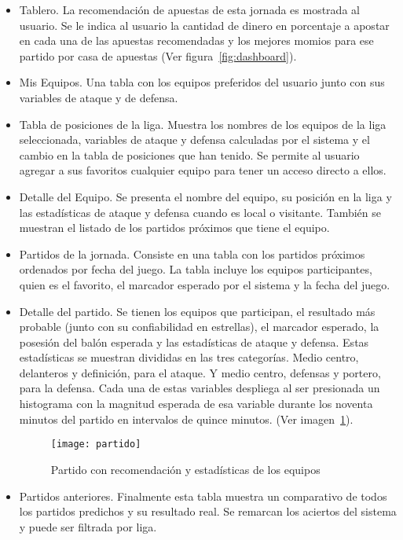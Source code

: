 \begin{itemize}
\begin{itemize}
				\item Tablero. La recomendación de apuestas de esta jornada es mostrada al usuario. Se le indica al usuario la cantidad de dinero en porcentaje a apostar en cada una de las apuestas recomendadas y los mejores momios para ese partido por casa de apuestas (Ver figura~\ref{fig:dashboard}).
				\item Mis Equipos. Una tabla con los equipos preferidos del usuario junto con sus variables de ataque y de defensa.
				\item Tabla de posiciones de la liga. Muestra los nombres de los equipos de la liga seleccionada, variables de ataque y defensa calculadas por el sistema  y el cambio en la tabla de posiciones que han tenido. Se permite al usuario agregar a sus favoritos cualquier equipo para tener un acceso directo a ellos.  
				\item Detalle del Equipo. Se presenta el nombre del equipo, su posición en la liga y las estadísticas de ataque y defensa cuando es local o visitante. También se muestran el listado de los partidos próximos que tiene el equipo.
				\item Partidos de la jornada. Consiste en una tabla con los partidos próximos ordenados por fecha del juego. La tabla incluye los equipos participantes, quien es el favorito, el marcador esperado por el sistema y la fecha del juego.
				\item Detalle del partido. Se tienen los equipos que participan, el resultado más probable (junto con su confiabilidad en estrellas), el marcador esperado, la posesión del balón esperada y las estadísticas de ataque y defensa. Estas estadísticas se muestran divididas en las tres categorías. Medio centro, delanteros y definición, para el ataque. Y medio centro, defensas y portero, para la defensa. Cada una de estas variables despliega al ser presionada un histograma con la magnitud esperada de esa variable durante los noventa minutos del partido en intervalos de quince minutos. (Ver imagen~\ref{Fig:partido}). 
				\begin{figure}[!htb]\centering
				   \begin {minipage}{0.8\textwidth}
				     \texttt{[image: partido]}
				     \caption{Partido con recomendación y estadísticas de los equipos}\label{Fig:partido}
				   \end{minipage}
				\end{figure}
				
				\item Partidos anteriores. Finalmente esta tabla muestra un comparativo de todos los partidos predichos y su resultado real. Se remarcan los aciertos del sistema y puede ser filtrada por liga.
				
			\end{itemize}
			
		\end{itemize}
		
